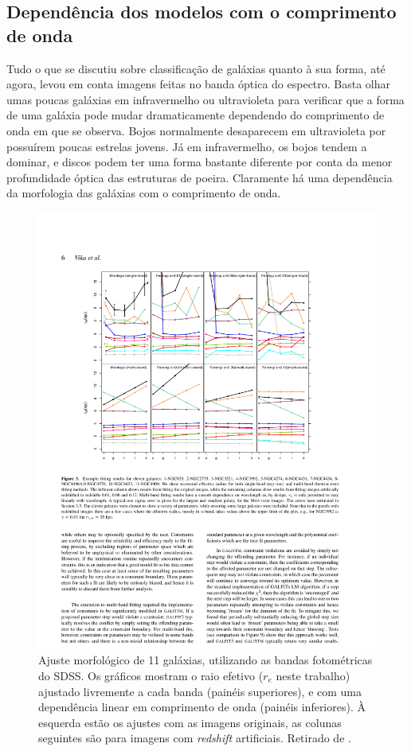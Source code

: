 \subsection{Dependência dos modelos com o comprimento de onda}
\label{sec:morph:comp:depLambda}

Tudo o que se discutiu sobre classificação de galáxias quanto à sua forma, até
agora, levou em conta imagens feitas no banda óptica do espectro. Basta olhar
umas poucas galáxias em infravermelho ou ultravioleta para verificar que a forma
de uma galáxia pode mudar dramaticamente dependendo do comprimento de onda em
que se observa. Bojos normalmente desaparecem em ultravioleta por possuírem
poucas estrelas jovens. Já em infravermelho, os bojos tendem a dominar, e discos
podem ter uma forma bastante diferente por conta da menor profundidade óptica
das estruturas de poeira. Claramente há uma dependência da morfologia das
galáxias com o comprimento de onda.

\begin{figure}
	\includegraphics{figuras/vika-properties}
	\caption[Ajuste morfológico de bandas fotométricas] {Ajuste
	morfológico de 11 galáxias, utilizando as bandas fotométricas do
	SDSS. Os gráficos mostram o raio efetivo ($r_e$ neste trabalho) ajustado
	livremente a cada banda (painéis superiores), e com uma dependência linear em
	comprimento de onda (painéis inferiores). À esquerda estão os ajustes com as
	imagens originais, as colunas seguintes são para imagens com {\em redshift}
	artificiais. Retirado de \citet{Vika2013}.}
	\label{fig:propertiesVika}
\end{figure}

